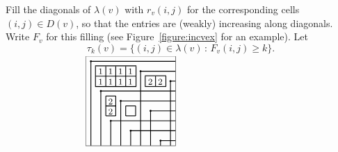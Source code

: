 \documentclass[12pt]{amsart}
\theoremstyle{definition}
\theoremstyle{remark}
\numberwithin{equation}{section}
\begin{document}
Fill the diagonals of $\lambda(v)$ with $r_v(i,j)$ for the corresponding cells $(i,j)\in D(v)$, so that the entries are (weakly) increasing along diagonals.  Write $F_v$ for this filling (see Figure~\ref{figure:incvex} for an example). Let \[\tau_k(v)=\{(i,j)\in \lambda(v) \,:  \, F_v(i,j)\geq k\}.\]

\begin{figure}
\label{fig:vex}
	\[\setlength{\unitlength}{.18mm}
	\begin{picture}(380,180)
		\put(0,15){\framebox(180,180)}
		\thicklines
		\put(10,185){\circle*{4}}
		\put(10,185){\line(1,0){170}}
		\put(10,185){\line(0,-1){170}}
		\put(110,165){\circle*{4}}
		\put(110,165){\line(1,0){70}}
		\put(110,165){\line(0,-1){150}}
		\put(170,145){\circle*{4}}
		\put(170,145){\line(1,0){10}}
		\put(170,145){\line(0,-1){130}}
		\put(30,125){\circle*{4}}
		\put(30,125){\line(1,0){150}}
		\put(30,125){\line(0,-1){110}}
		\put(70,105){\circle*{4}}
		\put(70,105){\line(1,0){110}}
		\put(70,105){\line(0,-1){90}}
		\put(130,85){\circle*{4}}
		\put(130,85){\line(1,0){50}}
		\put(130,85){\line(0,-1){70}}
		\put(50,65){\circle*{4}}
		\put(50,65){\line(1,0){130}}
		\put(50,65){\line(0,-1){50}}
		\put(90,45){\circle*{4}}
		\put(90,45){\line(1,0){90}}
		\put(90,45){\line(0,-1){30}}
		\put(150,25){\circle*{4}}
		\put(150,25){\line(1,0){30}}
		\put(150,25){\line(0,-1){10}}
		
		\put(20,135){\framebox(80,40)}
		\put(40,135){\line(0,1){40}}
		\put(60,135){\line(0,1){40}}
		\put(80,135){\line(0,1){40}}
		\put(20,155){\line(1,0){80}}
		
		
		\put(120,135){\framebox(40,20)}
		\put(140,135){\line(0,1){20}}
		
		
		
		\put(40,75){\line(0,1){40}}
		\put(40,95){\line(1,0){20}}
		\put(60,75){\line(0,1){40}}
		\put(40,95){\line(1,0){20}}
		\put(40,115){\line(1,0){20}}
		\put(40,75){\line(1,0){20}}
		
		
		\put(80,75){\line(1,0){20}}
		\put(80,95){\line(1,0){20}}
		\put(80,75){\line(0,1){20}}
		\put(100,75){\line(0,1){20}}
		
		
		\put(25,159){\small${1}$}
		\put(45,159){\small$1$}
		\put(65,159){\small$1$}
		\put(85,159){\small$1$}
		\put(25,138){\small$1$}
		\put(45,138){\small$1$}
		\put(65,138){\small$1$}
		\put(85,138){\small$1$}
		
		\put(125,138){\small$2$}
		\put(145,138){\small$2$}
		\put(45,98){\small$2$}
		\put(45,78){\small$2$}
		

\end{picture}\]
\end{figure}
\end{document}

